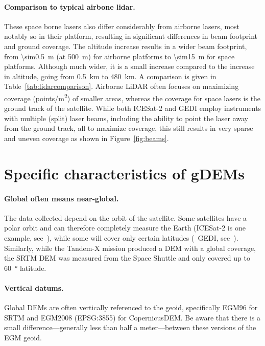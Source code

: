\paragraph{Comparison to typical airbone lidar.}
These space borne lasers also differ considerably from airborne lasers, most notably so in their platform, resulting in significant differences in beam footprint and ground coverage.
The altitude increase results in a wider beam footprint, from \qty{\sim0.5}{m} (at \qty{500}{m}) for airborne platforms to \qty{\sim15}{m} for space platforms.
Although much wider, it is a small increase compared to the increase in altitude, going from \qty{0.5}{km} to \qty{480}{km}.
A comparison is given in Table~\ref{tab:lidarcomparison}.
Airborne LiDAR often focuses on maximizing coverage (\unit{points/m^2}) of smaller areas, whereas the coverage for space lasers is the ground track of the satellite.
While both ICESat-2 and GEDI employ instruments with multiple (split) laser beams, including the ability to point the laser away from the ground track, all to maximize coverage, this still results in very sparse and uneven coverage as shown in Figure~\ref{fig:beams}.



%
\section[Specific characteristics]{Specific characteristics of gDEMs}

\paragraph{Global often means near-global.}

The data collected depend on the orbit of the satellite.
Some satellites have a polar orbit and can therefore completely measure the Earth (ICESat-2 is one example, see~), while some will cover only certain latitudes (\eg\ GEDI, see~).
Similarly, while the Tandem-X mission produced a DEM with a global coverage, the SRTM DEM was measured from the Space Shuttle and only covered up to \qty{60}{\degree} latitude.


\paragraph{Vertical datums.}

Global DEMs are often vertically referenced to the geoid, specifically EGM96 for SRTM and EGM2008 (EPSG:3855) for CopernicusDEM\@.
Be aware that there is a small difference---generally less than half a meter---between these versions of the EGM geoid.


